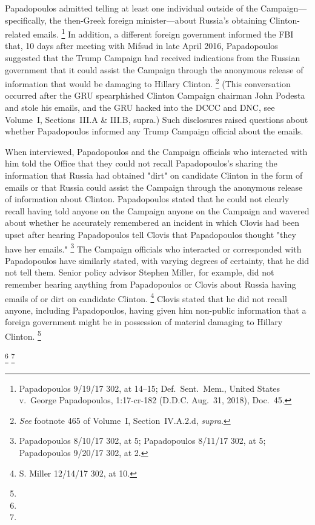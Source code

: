 Papadopoulos admitted telling at least one individual outside of the Campaign---specifically, the then-Greek foreign minister---about Russia's obtaining Clinton-related emails.%
\footnote{Papadopoulos 9/19/17 302, at 14--15;
Def.~Sent.~Mem., United States v.\ George Papadopoulos, 1:17-cr-182 (D.D.C. Aug.~31, 2018), Doc.~45.}
In addition, a different foreign government informed the FBI that, 10 days after meeting with Mifsud in late April 2016, Papadopoulos suggested that the Trump Campaign had received indications from the Russian government that it could assist the Campaign through the anonymous release of information that would be damaging to Hillary Clinton.%
\footnote{\textit{See} footnote 465 of Volume~I, Section~IV.A.2.d, \textit{supra}.}
(This conversation occurred after the GRU spearphished Clinton Campaign chairman John Podesta and stole his emails, and the GRU hacked into the DCCC and DNC, see Volume~I, Sections~III.A \& III.B, supra.)
Such disclosures raised questions about whether Papadopoulos informed any Trump Campaign official about the emails.

When interviewed, Papadopoulos and the Campaign officials who interacted with him told the Office that they could not recall Papadopoulos's sharing the information that Russia had obtained "dirt" on candidate Clinton in the form of emails or that Russia could assist the Campaign through the anonymous release of information about Clinton.
Papadopoulos stated that he could not clearly recall having told anyone on the Campaign anyone on the Campaign and wavered about whether he accurately remembered an incident in which Clovis had been upset after hearing Papadopoulos tell Clovis that Papadopoulos thought "they have her emails."%
\footnote{Papadopoulos 8/10/17 302, at 5;
Papadopoulos 8/11/17 302, at 5;
Papadopoulos 9/20/17 302, at 2.}
The Campaign officials who interacted or corresponded with Papadopoulos have similarly stated, with varying degrees of certainty, that he did not tell them.
Senior policy advisor Stephen Miller, for example, did not remember hearing anything from Papadopoulos or Clovis about Russia having emails of or dirt on candidate Clinton.%
\footnote{S. Miller 12/14/17 302, at 10.}
Clovis stated that he did not recall anyone, including Papadopoulos, having given him non-public information that a foreign government might be in possession of material damaging to Hillary Clinton.%
\footnote{}

\footnote{}
\footnote{}

